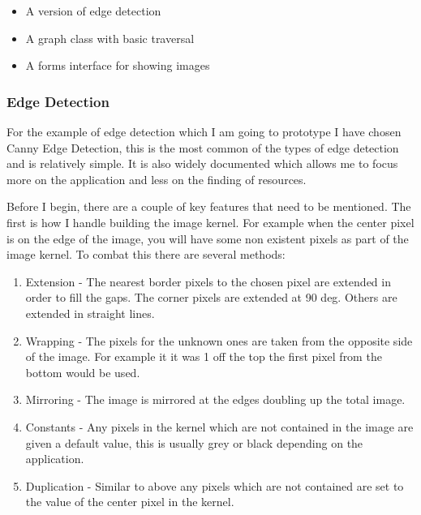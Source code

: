 \begin{FlushLeft}
        \begin{itemize}
            \item A version of edge detection
            \item A graph class with basic traversal
            \item A forms interface for showing images
        \end{itemize} \bk
        

        \subsubsection{Edge Detection}
        For the example of edge detection which I am going to prototype I have chosen Canny Edge Detection, this is the most common of the types of edge detection and is relatively simple. It is also widely documented which allows me to focus more on the application and less on the finding of resources. \\ \bk

        Before I begin, there are a couple of key features that need to be mentioned. The first is how I handle building the image kernel. For example when the center pixel is on the edge of the image, you will have some non existent pixels as part of the image kernel. To combat this there are several methods:
        
        \begin{enumerate}
            \item Extension - The nearest border pixels to the chosen pixel are extended in order to fill the gaps. The corner pixels are extended at 90 deg. Others are extended in straight lines.
            \item Wrapping - The pixels for the unknown ones are taken from the opposite side of the image. For example it it was 1 off the top the first pixel from the bottom would be used.
            \item Mirroring - The image is mirrored at the edges doubling up the total image.
            \item Constants - Any pixels in the kernel which are not contained in the image are given a default value, this is usually grey or black depending on the application.
            \item Duplication - Similar to above any pixels which are not contained are set to the value of the center pixel in the kernel.
        \end{enumerate} \bk
        

\end{FlushLeft}

